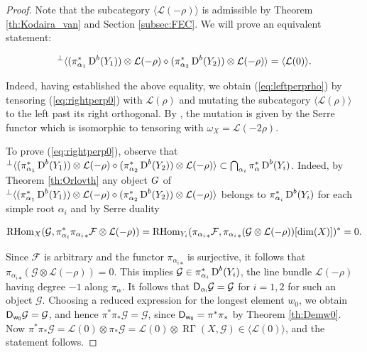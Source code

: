 \documentclass[sn-mathphys-num]{sn-jnl}%
\newcommand\G{{\mathcal G}}
\newcommand{\Ff}{\mathcal F}
\newcommand{\Ll}{\mathcal L}
\newcommand{\subsetq}{\subset}
\newcommand*{\Dd}{\mathop{\mathrm D\kern0pt}\nolimits}
\newcommand*{\RGamma}{\mathop{\mathrm {R\Gamma}}\nolimits}
\newcommand*{\RHom}{\mathop{\mathrm {RHom}}\nolimits}
\newcommand{\sd}{\sf D}
\newcommand{\bg}{\mathbf G}
\theoremstyle{definition}
\begin{document}
\begin{proof}
Note that the subcategory $\langle \Ll (-\rho)\rangle$ is admissible by Theorem \ref{th:Kodaira_van} and Section \ref{subsec:FEC}.
We will prove an equivalent statement: 

\begin{equation}\label{eq:rightperp0}
^{\perp}\langle (\pi _{\alpha _1}^{\ast}\Dd ^b(Y_1))\otimes \Ll (-\rho)\diamond (\pi _{\alpha _2}^{\ast}\Dd ^b(Y_2))\otimes\Ll (-\rho)\rangle=\langle \Ll (0)\rangle.
\end{equation}

Indeed, having established the above equality, we obtain (\ref{eq:leftperprho}) by tensoring (\ref{eq:rightperp0}) with $\Ll (\rho)$ and mutating the subcategory $\langle \Ll (\rho)\rangle$ to the left past its right orthogonal. By \cite[Lemma 2.11]{Kuzrat}, the mutation is given by the Serre functor which is isomorphic to tensoring with $\omega _X=\Ll (-2\rho)$. 

To prove (\ref{eq:rightperp0}), observe that $^{\perp}\langle (\pi _{\alpha _1}^{\ast}\Dd ^b(Y_1))\otimes \Ll (-\rho)\diamond (\pi _{\alpha _2}^{\ast}\Dd ^b(Y_2))\otimes\Ll (-\rho)\rangle\subsetq \bigcap _{\alpha _i}\pi _{\alpha}^{\ast}\Dd ^b(Y_i)$. Indeed, by Theorem \ref{th:Orlovth} any object $\mathcal \bg$ of $^{\perp}\langle (\pi _{\alpha _1}^{\ast}\Dd ^b(Y_1))\otimes \Ll (-\rho)\diamond (\pi _{\alpha _2}^{\ast}\Dd ^b(Y_2))\otimes\Ll (-\rho)\rangle$ belongs to $\pi _{\alpha _i}^{\ast}\Dd ^b(Y_i)$ for each simple root $\alpha _i$ and by Serre duality

\begin{equation}
\RHom  _X(\mathcal G,\pi _{\alpha _i}^{\ast}{\pi _{\alpha _i}}_{\ast}\Ff \otimes \Ll ({-\rho})) = \RHom  _{Y_i}({\pi _{\alpha _i}}_{\ast}\Ff,{\pi _{\alpha _i}}_{\ast} (\mathcal G\otimes \Ll ({-\rho}))[{\rm dim}(X)])^{\ast}=0.
\end{equation}

Since $\Ff$ is arbitrary and the functor ${\pi _{\alpha _i}}_{\ast}$ is surjective, it follows that ${\pi _{\alpha _i}}_{\ast} (\mathcal G\otimes \Ll ({-\rho}))=0$. This implies $\mathcal G\in \pi _{\alpha _i}^{\ast}\Dd ^b(Y_i)$, the line bundle $\Ll ({-\rho})$ having degree $-1$ along $\pi _{\alpha}$. It follows that $\sd _{\alpha _i}\mathcal G=\mathcal \G$ for $i=1,2$ for such an object $\mathcal \G$. Choosing a reduced expression for the longest element $w_0$, we obtain $\sd _{w_0}\mathcal G=\mathcal G$, and 
hence $\pi ^{\ast}\pi _{\ast}\mathcal G=\mathcal G$, since $\sd _{w_0}=\pi ^{\ast}\pi _{\ast}$ by Theorem \ref{th:Demw0}. Now $\pi ^{\ast}\pi _{\ast}\mathcal G=\Ll (0)\otimes \pi _{\ast}\mathcal G=\Ll (0)\otimes \RGamma(X,\mathcal G)\in \langle \Ll (0)\rangle$, and the statement follows.
\end{proof}
\end{document}
